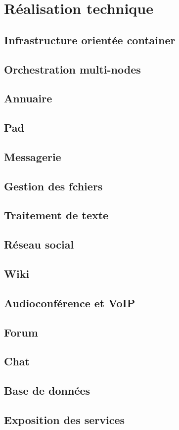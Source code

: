 \section{Réalisation technique}

\subsection{Infrastructure orientée container}

\subsection{Orchestration multi-nodes}

\subsection{Annuaire}

\subsection{Pad}

\subsection{Messagerie}

\subsection{Gestion des fchiers}

\subsection{Traitement de texte}

\subsection{Réseau social}

\subsection{Wiki}

\subsection{Audioconférence et VoIP}

\subsection{Forum}

\subsection{Chat}

\subsection{Base de données}

\subsection{Exposition des services}